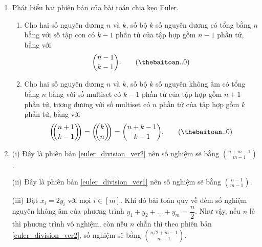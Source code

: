 \documentclass[a4paper, 11pt]{article}
\theoremstyle{definition}
\begin{document}
	\begin{enumerate}[label=(\alph*)]
		\item Phát biểu hai phiên bản của bài toán chia kẹo Euler. 
		\begin{enumerate}[label=\arabic*.]
			\item Cho hai số nguyên dương $n$ và $k$, số bộ $k$ số nguyên dương có tổng bằng $n$ bằng với số tập con có $k-1$ phần tử của tập hợp gồm $n-1$ phần tử, bằng với \begin{align}
				{n-1 \choose k-1}. \label{euler_division_ver1}\tag{\thebaitoan.\alph{enumi}.\arabic{enumii}}
				\end{align}
			\item Cho hai số nguyên dương $n$ và $k$, số bộ $k$ số nguyên không âm có tổng bằng $n$ bằng với số multiset có $k-1$ phần tử của tập hợp gồm $n+1$ phần tử, tương đương với số multiset có $n$ phần tử của tập hợp gồm $k$ phần tử, bằng với \begin{align}
				{\displaystyle \left(\!\!{\binom {n+1}{k-1}}\!\!\right)} = {\displaystyle \left(\!\!{\binom {k}{n}}\!\!\right)} = {n+k-1 \choose k-1}. \label{euler_division_ver2}\tag{\thebaitoan.\alph{enumi}.\arabic{enumii}}
			\end{align}
		\end{enumerate}
		\item (i) Đây là phiên bản \ref{euler_division_ver2} nên số nghiệm sẽ bằng $\displaystyle {n+m-1 \choose m-1}$.
		
		(ii) Đây là phiên bản \ref{euler_division_ver1} nên số nghiệm sẽ bằng $\displaystyle {n-1 \choose m-1}$.

		(iii) Đặt $x_i = 2y_i$ với mọi $i\in [m]$. Khi đó bài toán quy về đếm số nghiệm nguyên không âm của phương trình $y_1 + y_2 +\ldots + y_m = \dfrac{n}{2}$. Như vậy, nếu $n$ lẻ thì phương trình vô nghiệm, còn nếu $n$ chẵn thì theo phiên bản \ref{euler_division_ver2}, số nghiệm sẽ bằng $\displaystyle {n/2 +m-1 \choose m-1}$.


\end{enumerate}
\end{document}
